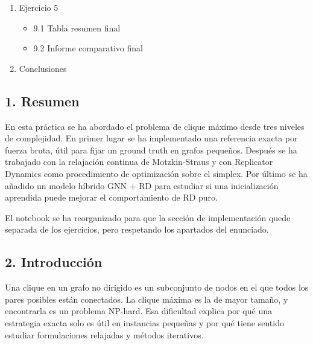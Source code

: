 \documentclass[11pt]{article}
\providecommand{\tightlist}{%
      \setlength{\itemsep}{0pt}\setlength{\parskip}{0pt}}
\begin{document}
\begin{enumerate}
\begin{itemize}
    \begin{itemize}
    \tightlist
    \item
      Fuerza Bruta
    \item
      RD puro desde el baricentro
    \item
      GNN + RD
    \end{itemize}
  \item
    8.4 Ablación: variar el número de iteraciones de RD (train: 0,1,3,5;
    test: 10,50,100)
  \item
    8.5 Informe del ejercicio
  \end{itemize}
\item
  Ejercicio 5

  \begin{itemize}
  \tightlist
  \item
    9.1 Tabla resumen final
  \item
    9.2 Informe comparativo final
  \end{itemize}
\item
  Conclusiones
\end{enumerate}

    \subsection{1. Resumen}\label{resumen}

    En esta práctica se ha abordado el problema de clique máximo desde tres
niveles de complejidad. En primer lugar se ha implementado una
referencia exacta por fuerza bruta, útil para fijar un ground truth en
grafos pequeños. Después se ha trabajado con la relajación continua de
Motzkin-Straus y con Replicator Dynamics como procedimiento de
optimización sobre el simplex. Por último se ha añadido un modelo
híbrido GNN + RD para estudiar si una inicialización aprendida puede
mejorar el comportamiento de RD puro.

El notebook se ha reorganizado para que la sección de implementación
quede separada de los ejercicios, pero respetando los apartados del
enunciado.

    \subsection{2. Introducción}\label{introducciuxf3n}

    Una clique en un grafo no dirigido es un subconjunto de nodos en el que
todos los pares posibles están conectados. La clique máxima es la de
mayor tamaño, y encontrarla es un problema NP-hard. Esa dificultad
explica por qué una estrategia exacta solo es útil en instancias
pequeñas y por qué tiene sentido estudiar formulaciones relajadas y
métodos iterativos.
\end{document}
